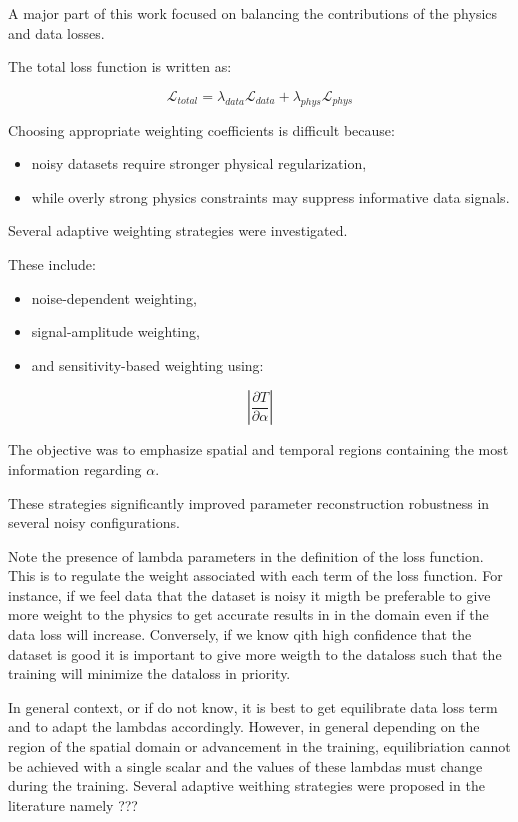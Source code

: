 A major part of this work focused on balancing the contributions of the physics and data losses.

The total loss function is written as:

\begin{equation}
\mathcal{L}_{total}
=
\lambda_{data}\mathcal{L}_{data}
+
\lambda_{phys}\mathcal{L}_{phys}
\end{equation}

Choosing appropriate weighting coefficients is difficult because:
\begin{itemize}
    \item noisy datasets require stronger physical regularization,
    \item while overly strong physics constraints may suppress informative data signals.
\end{itemize}

Several adaptive weighting strategies were investigated.

These include:
\begin{itemize}
    \item noise-dependent weighting,
    \item signal-amplitude weighting,
    \item and sensitivity-based weighting using:
\end{itemize}

\begin{equation}
\left|
\frac{\partial T}{\partial \alpha}
\right|
\end{equation}

The objective was to emphasize spatial and temporal regions containing the most information regarding $\alpha$.

These strategies significantly improved parameter reconstruction robustness in several noisy configurations.

Note the presence of lambda parameters in the definition of the loss function. This is to regulate the weight associated with each term of the loss function. For instance, if we feel data that the dataset is noisy it migth be preferable to give more weight to the physics to get accurate results in in the domain even if the data loss will increase. Conversely, if we know qith high confidence that the dataset is good it is important to give more weigth to the dataloss such that the training will minimize the dataloss in priority. 

In general context, or if do not know, it is best to get equilibrate data loss term and to adapt the lambdas accordingly. However, in general depending on the region of the spatial domain or advancement in the training, equilibriation cannot be achieved with a single scalar and the values of these lambdas must change during the training. Several adaptive weithing strategies were proposed in the literature namely ???

